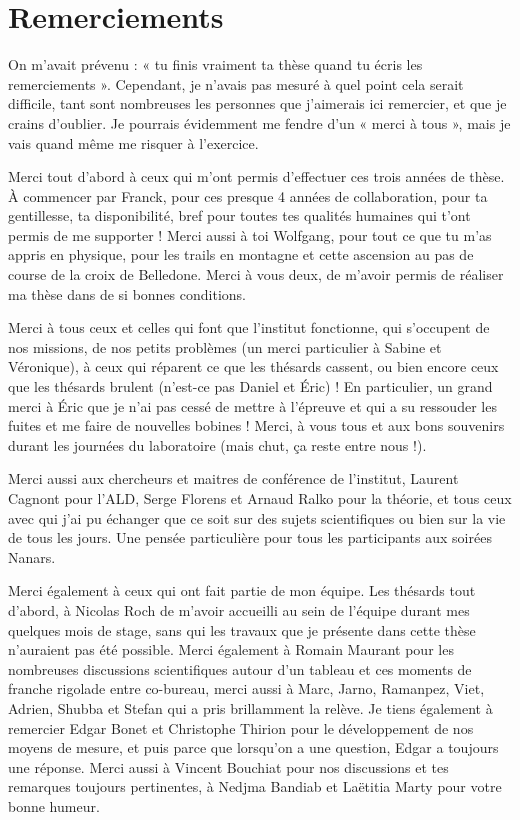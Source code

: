 \section*{Remerciements}

On m'avait prévenu : « tu finis vraiment ta thèse quand tu écris les remerciements ». Cependant, je n'avais pas mesuré à quel point cela serait difficile, tant sont nombreuses les personnes que j'aimerais ici remercier, et que je crains d'oublier. Je pourrais évidemment me fendre d'un « merci à tous », mais je vais quand même me risquer à l'exercice.


Merci tout d'abord à ceux qui m'ont permis d'effectuer ces trois années de thèse. À commencer par Franck, pour ces presque 4 années de collaboration, pour ta gentillesse, ta disponibilité, bref pour toutes tes qualités humaines qui t'ont permis de me supporter ! Merci aussi à toi Wolfgang, pour tout ce que tu m'as appris en physique, pour les trails en montagne et cette ascension au pas de course de la croix de Belledone. Merci à vous deux, de m'avoir permis de réaliser ma thèse dans de si bonnes conditions.


Merci à tous ceux et celles qui font que l'institut fonctionne, qui s'occupent de nos missions, de nos petits problèmes (un merci particulier à Sabine et Véronique), à ceux qui réparent ce que les thésards cassent, ou bien encore ceux que les thésards brulent (n'est-ce pas Daniel et Éric) ! En particulier, un grand merci à Éric que je n'ai pas cessé de mettre à l'épreuve et qui a su ressouder les fuites et me faire de nouvelles bobines ! Merci, à vous tous et aux bons souvenirs durant les journées du laboratoire (mais chut, ça reste entre nous !).


Merci aussi aux chercheurs et maitres de conférence de l'institut, Laurent Cagnont pour l'ALD, Serge Florens et Arnaud Ralko pour la théorie, et tous ceux avec qui j'ai pu échanger que ce soit sur des sujets scientifiques ou bien sur la vie de tous les jours. Une pensée particulière pour tous les participants aux soirées Nanars.


Merci également à ceux qui ont fait partie de mon équipe. Les thésards tout d'abord, à Nicolas Roch de m'avoir accueilli au sein de l'équipe durant mes quelques mois de stage, sans qui les travaux que je présente dans cette thèse n'auraient pas été possible. Merci également à Romain Maurant pour les nombreuses discussions scientifiques autour d'un tableau et ces moments de franche rigolade entre co-bureau, merci aussi à Marc, Jarno, Ramanpez, Viet, Adrien, Shubba et Stefan qui a pris brillamment la relève. Je tiens également à remercier Edgar Bonet et Christophe Thirion pour le développement de nos moyens de mesure, et puis parce que lorsqu'on a une question, Edgar a toujours une réponse. Merci aussi à Vincent Bouchiat pour nos discussions et tes remarques toujours pertinentes, à Nedjma Bandiab et Laëtitia Marty pour votre bonne humeur.


